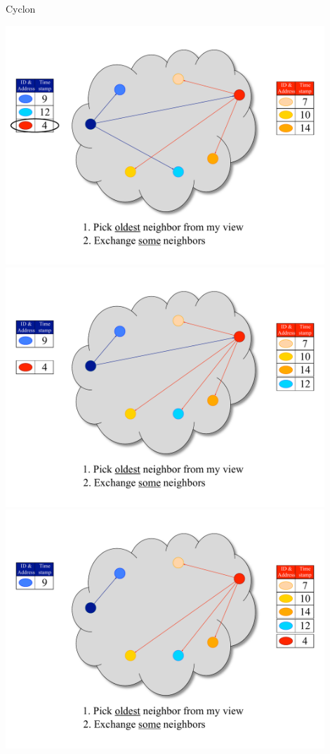 \begin{frame}{Cyclon}
\begin{overprint}
\includegraphics[width=0.9\textwidth]{4_cyclon}
\includegraphics[width=0.9\textwidth]{5_cyclon}
\includegraphics[width=0.9\textwidth]{6_cyclon}

\end{overprint}
\end{frame}
